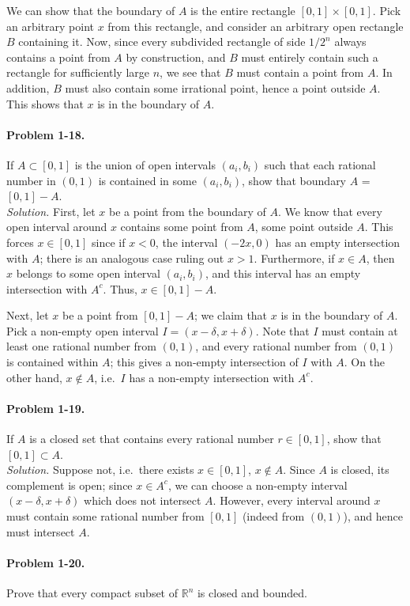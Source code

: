\documentclass[11pt]{report}
\newcommand{\R}{\mathbb{R}}
\newcommand{\problem}[1]{\paragraph{Problem #1.}}
\newcommand{\solution}{\noindent\textit{Solution.} }
\begin{document}
    We can show that the boundary of $A$ is the entire rectangle $[0, 1] \times [0,
    1]$. Pick an arbitrary point $x$ from this rectangle, and consider an arbitrary
    open rectangle $B$ containing it. Now, since every subdivided rectangle of side
    $1 / 2^n$ always contains a point from $A$ by construction, and $B$ must entirely
    contain such a rectangle for sufficiently large $n$, we see that $B$ must
    contain a point from $A$. In addition, $B$ must also contain some irrational
    point, hence a point outside $A$. This shows that $x$ is in the boundary of $A$.


    \problem{1-18} If $A \subset [0, 1]$ is the union of open intervals $(a_i, b_i)$
    such that each rational number in $(0, 1)$ is contained in some $(a_i, b_i)$,
    show that boundary $A$ = $[0, 1] - A$. \\

    \solution First, let $x$ be a point from the boundary of $A$. We know that every
    open interval around $x$ contains some point from $A$, some point outside $A$.
    This forces $x \in [0, 1]$ since if $x < 0$, the interval $(-2x, 0)$ has an empty
    intersection with $A$; there is an analogous case ruling out $x > 1$.
    Furthermore, if $x \in A$, then $x$ belongs to some open interval $(a_i, b_i)$,
    and this interval has an empty intersection with $A^c$. Thus, $x \in [0, 1] - A$.

    Next, let $x$ be a point from $[0, 1] - A$; we claim that $x$ is in the boundary
    of $A$. Pick a non-empty open interval $I = (x - \delta, x + \delta)$. Note that
    $I$ must contain at least one rational number from $(0, 1)$, and every rational
    number from $(0, 1)$ is contained within $A$; this gives a non-empty intersection
    of $I$ with $A$. On the other hand, $x \notin A$, i.e.\ $I$ has a non-empty
    intersection with $A^c$.


    \problem{1-19} If $A$ is a closed set that contains every rational number $r \in
    [0, 1]$, show that $[0, 1] \subset A$. \\

    \solution Suppose not, i.e.\ there exists $x \in [0, 1]$, $x \notin A$. Since $A$
    is closed, its complement is open; since $x \in A^c$, we can choose a non-empty
    interval $(x - \delta, x + \delta)$ which does not intersect $A$. However, every
    interval around $x$ must contain some rational number from $[0, 1]$ (indeed from
    $(0, 1)$), and hence must intersect $A$.


    \problem{1-20} Prove that every compact subset of $\R^n$ is closed and bounded.
    \\
\end{document}
